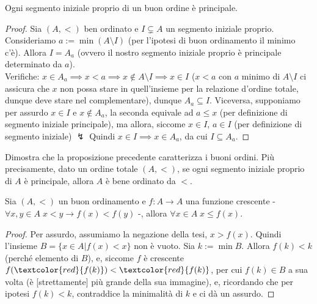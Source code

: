 \documentclass[11pt]{scrartcl}
\begin{document}
\begin{proposition}
	Ogni segmento iniziale proprio di un buon ordine è principale.
\end{proposition}

\begin{proof}
	Sia $(A,<)$ ben ordinato e $I \subsetneq A$ un segmento iniziale proprio. Consideriamo $a := \min(A \setminus I)$ (per l'ipotesi di buon ordinamento il minimo c'è). Allora $I = A_a$ (ovvero 
	il nostro segmento iniziale proprio è principale determinato da $a$).\\
	Verifiche: $x \in A_a \implies x < a \implies x \not \in A \setminus I \implies x \in I$ ($x < a$ con $a$ minimo di $A \setminus I$ ci assicura che $x$ non possa stare in quell'insieme per la relazione
	d'ordine totale, dunque deve stare nel complementare), dunque $A_a \subseteq I$. Viceversa, supponiamo per assurdo $x \in I$ e $x \not \in A_a$, la seconda equivale ad $a \leq x$ (per definizione di segmento iniziale 
	principale), ma allora, siccome $x \in I$, $a \in I$ (per definizione di segmento iniziale) $\lightning$ Quindi $x \in I \implies x \in A_a$, da cui $I \subseteq A_a$.
\end{proof}

\begin{exercise}
	Dimostra che la proposizione precedente caratterizza i buoni ordini. Più precisamente, dato un ordine totale $(A,<)$, se ogni segmento iniziale proprio di $A$
	è principale, allora $A$ è bene ordinato da $<$.
\end{exercise}

\begin{lemma}
	Sia $(A,<)$ un buon ordinamento e $f : A \rightarrow A$ una funzione crescente - $\forall x,y \in A \; x < y \rightarrow f(x) < f(y)$ -, allora $\forall x \in A \; x \leq f(x)$.
\end{lemma}

\begin{proof}
	Per assurdo, assumiamo la negazione della tesi, $x > f(x)$. Quindi l'insieme $B = \{x \in A | f(x) < x\}$ non è vuoto. Sia $k := \min B$.
	Allora $f(k) < k$ (perché elemento di $B$), e, siccome $f$ è crescente $f(\textcolor{red}{f(k)}) < \textcolor{red}{f(k)}$, per cui $f(k) \in B$ a sua volta (è [strettamente] più grande della sua immagine),
	e, ricordando che per ipotesi $f(k)<k$, contraddice la minimalità di $k$ e ci dà un assurdo.
\end{proof}
\end{document}
